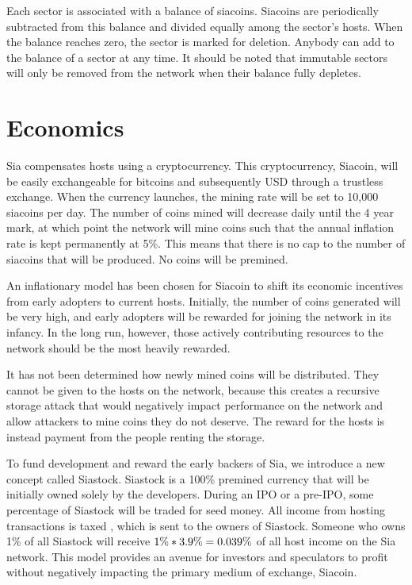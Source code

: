 \documentclass[twocolumn]{article}
\begin{document}
Each sector is associated with a balance of siacoins.
Siacoins are periodically subtracted from this balance and divided equally among the sector's hosts.
When the balance reaches zero, the sector is marked for deletion.
Anybody can add to the balance of a sector at any time.
It should be noted that immutable sectors will only be removed from the network when their balance fully depletes.

\section{Economics}
Sia compensates hosts using a cryptocurrency.
This cryptocurrency, Siacoin, will be easily exchangeable for bitcoins and subsequently USD through a trustless exchange.
When the currency launches, the mining rate will be set to 10,000 siacoins per day.
The number of coins mined will decrease daily until the 4 year mark, at which point the network will mine coins such that the annual inflation rate is kept permanently at 5\%.
This means that there is no cap to the number of siacoins that will be produced.
No coins will be premined.

An inflationary model has been chosen for Siacoin to shift its economic incentives from early adopters to current hosts.
Initially, the number of coins generated will be very high, and early adopters will be rewarded for joining the network in its infancy.
In the long run, however, those actively contributing resources to the network should be the most heavily rewarded.

It has not been determined how newly mined coins will be distributed.
They cannot be given to the hosts on the network, because this creates a recursive storage attack that would negatively impact performance on the network and allow attackers to mine coins they do not deserve.
The reward for the hosts is instead payment from the people renting the storage.

To fund development and reward the early backers of Sia, we introduce a new concept called Siastock.
Siastock is a 100\% premined currency that will be initially owned solely by the developers.
During an IPO or a pre-IPO, some percentage of Siastock will be traded for seed money.
All income from hosting transactions is taxed \hostincomefee{}, which is sent to the owners of Siastock.
Someone who owns 1\% of all Siastock will receive \(1\% * 3.9\%{} = 0.039\%\) of all host income on the Sia network.
This model provides an avenue for investors and speculators to profit without negatively impacting the primary medium of exchange, Siacoin.
\end{document}
